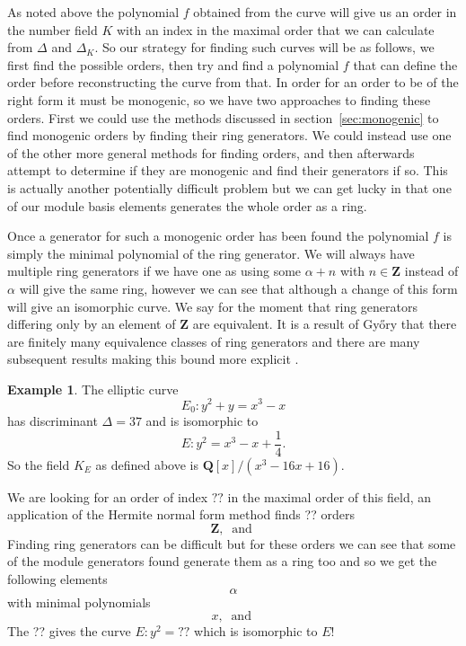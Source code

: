 \documentclass[12pt,a4paper,abstracton,bibtotoc]{scrreprt}
\theoremstyle{definition}
\newtheorem{ex}{Example}
\newcommand{\QQ}{\mathbf{Q}}
\newcommand{\ZZ}{\mathbf{Z}}
\begin{document}
As noted above the polynomial $f$ obtained from the curve will give us an order in the number field $K$ with an index in the maximal order that we can calculate from $\Delta$ and $\Delta_K$.
So our strategy for finding such curves will be as follows, we first find the possible orders, then try and find a polynomial $f$ that can define the order before reconstructing the curve from that.
In order for an order to be of the right form it must be monogenic, so we have two approaches to finding these orders.
First we could use the methods discussed in section~\ref{sec:monogenic} to find monogenic orders by finding their ring generators.
We could instead use one of the other more general methods for finding orders, and then afterwards attempt to determine if they are monogenic and find their generators if so.
This is actually another potentially difficult problem but we can get lucky in that one of our module basis elements generates the whole order as a ring.

Once a generator for such a monogenic order has been found the polynomial $f$ is simply the minimal polynomial of the ring generator.
We will always have multiple ring generators if we have one as using some $\alpha + n$ with $n\in \ZZ$ instead of $\alpha$ will give the same ring, however we can see that although a change of this form will give an isomorphic curve.
We say for the moment that ring generators differing only by an element of $\ZZ$ are equivalent.
It is a result of Gy\H{o}ry that there are finitely many equivalence classes of ring generators and there are many subsequent results making this bound more explicit \cite{monogenic}.


\begin{ex}
The elliptic curve
\[
E_0\colon y^2 + y = x^3 - x
\]
has discriminant $\Delta = 37$ and is isomorphic to
\[
E\colon y^2 = x^3 - x + \frac{1}{4}.
\]
So the field $K_E$ as defined above is $\QQ[x]/(x^3 - 16x + 16)$.

We are looking for an order of index $??$ in the maximal order of this field, an application of the Hermite normal form method finds ?? orders
\[
\ZZ,\ \text{ and }
\]
Finding ring generators can be difficult but for these orders we can see that some of the module generators found generate them as a ring too and so we get the following elements
\[
\alpha
\]
with minimal polynomials
\[
x,\ \text{ and }
\]
The ?? gives the curve $E\colon y^2 = ??$ which is isomorphic to $E$!
\end{ex}
\end{document}
